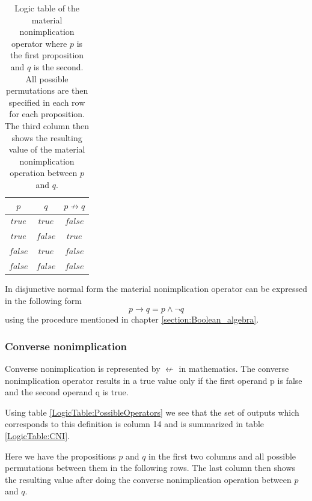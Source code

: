         \begin{table}[h!]
            \centering
            \begin{tabular}{|c|c|c|}
            	\hline
            	  $p$   &   $q$   & $p \not\rightarrow q$ \\ \hline
            	$true$  & $true$  &        $false$        \\ \hline
            	$true$  & $false$ &        $true$         \\ \hline
            	$false$ & $true$  &        $false$        \\ \hline
            	$false$ & $false$ &        $false$        \\ \hline
            \end{tabular}
            \caption{Logic table of the material nonimplication operator where $p$ is the first proposition and $q$ is the second. All possible permutations are then specified in each row for each proposition. The third column then shows the resulting value of the material nonimplication operation between $p$ and $q$.}
            \label{LogicTable:MNI}
        \end{table}
        
        In disjunctive normal form the material nonimplication operator can be expressed in the following form
        \begin{equation}
            p \rightarrow q = p \wedge \neg q 
        \end{equation}
        using the procedure mentioned in chapter \ref{section:Boolean_algebra}.
    
    \subsubsection{Converse nonimplication}
        Converse nonimplication is represented by $\not\leftarrow$ in mathematics. The converse nonimplication operator results in a true value only if the first operand p is false and the second operand q is true.
        
        Using table \ref{LogicTable:PossibleOperators} we see that the set of outputs which corresponds to this definition is column 14 and is summarized in table \ref{LogicTable:CNI}.
        
        Here we have the propositions $p$ and $q$ in the first two columns and all possible permutations between them in the following rows. The last column then shows the resulting value after doing the converse nonimplication operation between $p$ and $q$.
        

